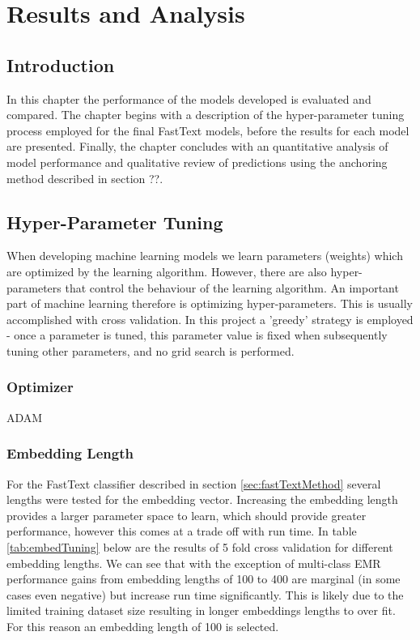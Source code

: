 \documentclass[Dissertation.tex]{subfiles}
\begin{document}
\chapter{Results and Analysis}
\section{Introduction}
In this chapter the performance of the models developed is evaluated and compared. The chapter begins with a description of the hyper-parameter tuning process employed for the final FastText models, before the results for each model are presented. Finally, the chapter concludes with an quantitative analysis of model performance and qualitative review of predictions using the anchoring method described in section ??.

\section{Hyper-Parameter Tuning} \label{sec:hypParams}
When developing machine learning models we learn parameters (weights) which are optimized by the learning algorithm. However, there are also hyper-parameters that control the behaviour of the learning algorithm. An important part of machine learning therefore is optimizing hyper-parameters. This is usually accomplished with cross validation. In this project a 'greedy' strategy is employed - once a parameter is tuned, this parameter value is fixed when subsequently tuning other parameters, and no grid search is performed.

\subsection{Optimizer}
ADAM

\subsection{Embedding Length}
For the FastText classifier described in section \ref{sec:fastTextMethod} several lengths were tested for the embedding vector. Increasing the embedding length provides a larger parameter space to learn, which should provide greater performance, however this comes at a trade off with run time. In table \ref{tab:embedTuning} below are the results of 5 fold cross validation for different embedding lengths. We can see that with the exception of multi-class EMR performance gains from embedding lengths of 100 to 400 are marginal (in some cases even negative) but increase run time significantly. This is likely due to the limited training dataset size resulting in longer embeddings lengths to over fit. For this reason an embedding length of 100 is selected.
\end{document}

